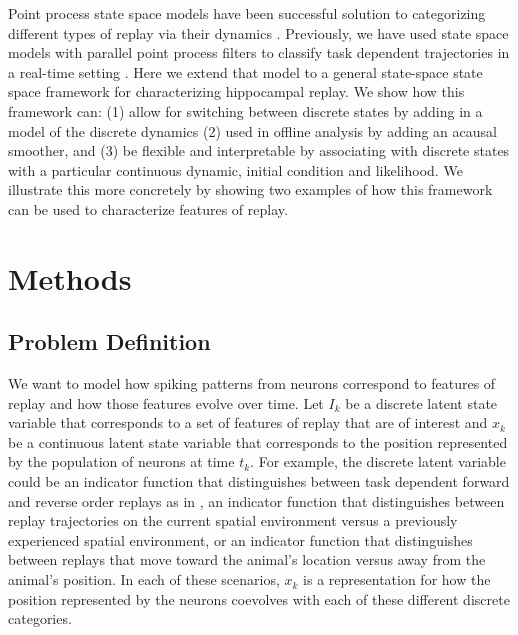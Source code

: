 \documentclass[conference]{IEEEtran}
\begin{document}
Point process state space models have been successful solution to categorizing different types of replay via their dynamics \cite{DengRapidclassificationhippocampal2016, EdenCharacterizingComplexMultiScale2018}. Previously, we have used state space models with parallel point process filters to classify task dependent trajectories in a real-time setting \cite{DengRapidclassificationhippocampal2016}. Here we extend that model to a general state-space state space framework for characterizing hippocampal replay. We show how this framework can: (1) allow for switching between discrete states by adding in a model of the discrete dynamics (2) used in offline analysis by adding an acausal smoother, and (3) be flexible and interpretable by associating with discrete states with a particular continuous dynamic, initial condition and likelihood. We illustrate this more concretely by showing two examples of how this framework can be used to characterize features of replay.

\section{Methods}
\subsection{Problem Definition}
We want to model how spiking patterns from neurons correspond to features of replay and how those features evolve over time. Let $I_{k}$ be a discrete latent state variable that corresponds to a set of features of replay that are of interest and $x_{k}$ be a continuous latent state variable that corresponds to the position represented by the population of neurons at time $t_{k}$. For example, the discrete latent variable could be an indicator function that distinguishes between task dependent forward and reverse order replays as in \cite{DengRapidclassificationhippocampal2016}, an indicator function that distinguishes between replay trajectories on the current spatial environment versus a previously experienced spatial environment, or an indicator function that distinguishes between replays that move toward the animal's location versus away from the animal's position. In each of these scenarios, $x_{k}$ is a representation for how the position represented by the neurons coevolves with each of these different discrete categories.
\end{document}
